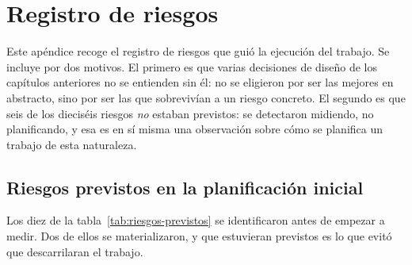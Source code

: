 \chapter{Registro de riesgos}
\label{ap:riesgos}

Este apéndice recoge el registro de riesgos que guió la ejecución del trabajo. Se incluye
por dos motivos. El primero es que varias decisiones de diseño de los capítulos anteriores
no se entienden sin él: no se eligieron por ser las mejores en abstracto, sino por ser las
que sobrevivían a un riesgo concreto. El segundo es que seis de los dieciséis riesgos
\emph{no} estaban previstos: se detectaron midiendo, no planificando, y esa es en sí misma
una observación sobre cómo se planifica un trabajo de esta naturaleza.

\section{Riesgos previstos en la planificación inicial}

Los diez de la tabla~\ref{tab:riesgos-previstos} se identificaron antes de empezar a
medir. Dos de ellos se materializaron, y que estuvieran previstos es lo que evitó que
descarrilaran el trabajo.

